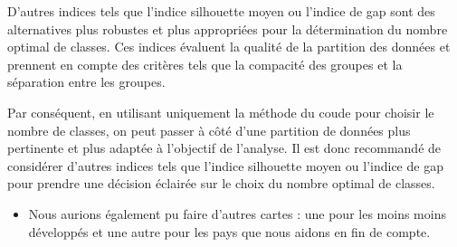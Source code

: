 \documentclass[
]{article}
\providecommand{\tightlist}{%
  \setlength{\itemsep}{0pt}\setlength{\parskip}{0pt}}
\begin{document}
D'autres indices tels que l'indice silhouette moyen ou l'indice de gap
sont des alternatives plus robustes et plus appropriées pour la
détermination du nombre optimal de classes. Ces indices évaluent la
qualité de la partition des données et prennent en compte des critères
tels que la compacité des groupes et la séparation entre les groupes.

Par conséquent, en utilisant uniquement la méthode du coude pour choisir
le nombre de classes, on peut passer à côté d'une partition de données
plus pertinente et plus adaptée à l'objectif de l'analyse. Il est donc
recommandé de considérer d'autres indices tels que l'indice silhouette
moyen ou l'indice de gap pour prendre une décision éclairée sur le choix
du nombre optimal de classes.

\begin{itemize}
\tightlist
\item
  Nous aurions également pu faire d'autres cartes : une pour les moins
  moins développés et une autre pour les pays que nous aidons en fin de
  compte.
\end{itemize}
\end{document}
